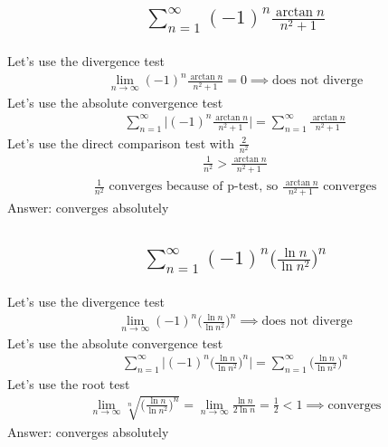\documentclass{article}
\begin{document}
\subsection{
	\begin{align*}
		\sum_{n = 1}^{\infty} (-1)^n \frac{\arctan{n}}{n^2 + 1}
	\end{align*}
}
Let's use the divergence test
\begin{align*}
	\lim_{n \to \infty} {(-1)^n \frac{\arctan{n}}{n^2 + 1}} = 0 \implies \text{does not diverge}
\end{align*}
Let's use the absolute convergence test
\begin{align*}
	\sum_{n = 1}^{\infty} \bigg| (-1)^n \frac{\arctan{n}}{n^2 + 1} \bigg| = \sum_{n = 1}^{\infty} \frac{\arctan{n}}{n^2 + 1}
\end{align*}
Let's use the direct comparison test with $\frac{2}{n^2}$
\begin{align*}
	\frac{1}{n^2} > \frac{\arctan{n}}{n^2 + 1}
\end{align*}
\begin{align*}
	\frac{1}{n^2} \text{ converges because of p-test, so } \frac{\arctan{n}}{n^2 + 1} \text{ converges}
\end{align*}
Answer: converges absolutely

\subsection{
	\begin{align*}
		\sum_{n = 1}^{\infty} (-1)^n \bigg( \frac{\ln{n}}{\ln{n^2}} \bigg)^n
	\end{align*}
}
Let's use the divergence test
\begin{align*}
	\lim_{n \to \infty} (-1)^n \bigg( \frac{\ln{n}}{\ln{n^2}} \bigg)^n \implies \text{does not diverge}
\end{align*}
Let's use the absolute convergence test
\begin{align*}
	\sum_{n = 1}^{\infty} \bigg| (-1)^n \bigg( \frac{\ln{n}}{\ln{n^2}} \bigg)^n \bigg| = \sum_{n = 1}^{\infty} \bigg( \frac{\ln{n}}{\ln{n^2}} \bigg)^n
\end{align*}
Let's use the root test
\begin{align*}
	\lim_{n \to \infty} {\sqrt[n]{\bigg( \frac{\ln{n}}{\ln{n^2}} \bigg)^n}} = \lim_{n \to \infty} {\frac{\ln{n}}{2\ln{n}}} = \frac{1}{2} < 1 \implies \text{converges}
\end{align*}
Answer: converges absolutely

\end{document}
